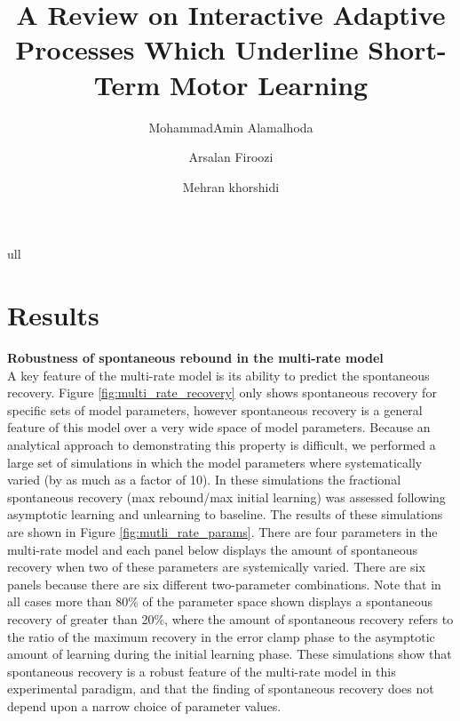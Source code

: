 \documentclass[9pt,twocolumn]{paper-template}
\title{A Review on Interactive Adaptive Processes Which Underline Short-Term Motor Learning}
\author[a]{MohammadAmin Alamalhoda}
\author[a]{Arsalan Firoozi}
\author[a]{Mehran khorshidi}
\affil[a]{Student, EE Department, Sharif University of Technology}
\begin{document}
\maketitle
\thispagestyle{firststyle}

ull
\\
\section*{Results}

\textbf{Robustness of spontaneous rebound in the multi-rate model}\\
A key feature of the multi-rate model is its ability to predict the spontaneous recovery. Figure \ref{fig:multi_rate_recovery} only shows spontaneous recovery for
specific sets of model parameters, however spontaneous recovery is a general feature of this
model over a very wide space of model parameters. Because an analytical approach to
demonstrating this property is difficult, we performed a large set of simulations in which the
model parameters where systematically varied (by as much as a factor of 10). In these simulations the fractional spontaneous
recovery (max rebound/max initial learning) was assessed following asymptotic learning and
unlearning to baseline. The results of these simulations are shown in Figure \ref{fig:mutli_rate_params}. There are four
parameters in the multi-rate model and each panel below displays the amount of
spontaneous recovery when two of these parameters are systemically varied. There are six
panels because there are six different two-parameter combinations. Note that in all cases
more than 80\% of the parameter space shown displays a spontaneous recovery of greater
than 20\%, where the amount of spontaneous recovery refers to the ratio of the maximum
recovery in the error clamp phase to the asymptotic amount of learning during the initial
learning phase. These simulations show that spontaneous recovery is a robust feature of
the multi-rate model in this experimental paradigm, and that the finding of spontaneous
recovery does not depend upon a narrow choice of parameter values. 
\end{document}
